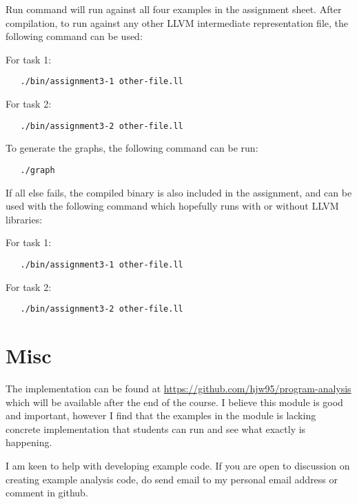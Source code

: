 \documentclass[11pt,a4paper,fleqn]{article}
\begin{document}
Run command will run against all four examples in the assignment sheet. After compilation, to run against any other LLVM intermediate representation file, the following command can be used:

For task 1:
\begin{verbatim}
   ./bin/assignment3-1 other-file.ll
\end{verbatim}

For task 2:
\begin{verbatim}
   ./bin/assignment3-2 other-file.ll
\end{verbatim}

To generate the graphs, the following command can be run:

\begin{verbatim}
   ./graph
\end{verbatim}

If all else fails, the compiled binary is also included in the assignment, and can be used with the following command which hopefully runs with or without LLVM libraries:

For task 1:
\begin{verbatim}
   ./bin/assignment3-1 other-file.ll
\end{verbatim}

For task 2:
\begin{verbatim}
   ./bin/assignment3-2 other-file.ll
\end{verbatim}

\section {Misc}

The implementation can be found at \url{https://github.com/hjw95/program-analysis} which will be available after the end of the course.
I believe this module is good and important, however I find that the examples in the module is lacking concrete implementation that students can run and see what exactly is happening.

I am keen to help with developing example code. If you are open to discussion on creating example analysis code, do send email to my personal email address or comment in github.
\end{document}
